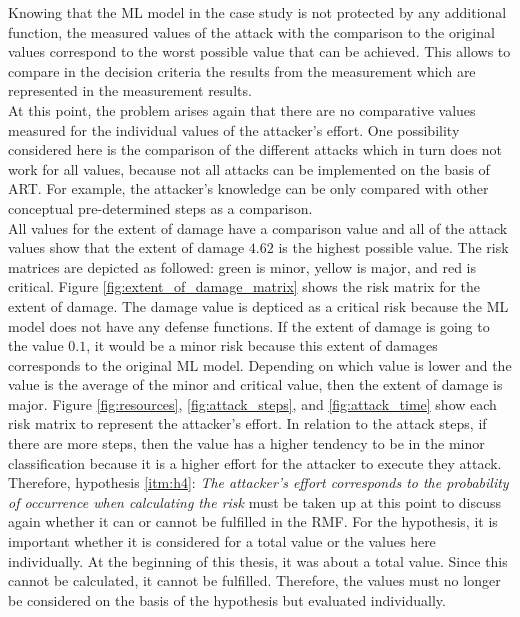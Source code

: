 Knowing that the ML model in the case study is not protected by any additional function, the measured values of the attack with the comparison to the original values correspond to the worst possible value that can be achieved. This allows to compare in the decision criteria the results from the measurement which are represented in the measurement results. \\
At this point, the problem arises again that there are no comparative values measured for the individual values of the attacker's effort. One possibility considered here is the comparison of the different attacks which in turn does not work for all values, because not all attacks can be implemented on the basis of ART. For example, the attacker's knowledge can be only compared with other conceptual pre-determined steps as a comparison. \\
All values for the extent of damage have a comparison value and all of the attack values show that the extent of damage $4.62$ is the highest possible value.
The risk matrices are depicted as followed: green is minor, yellow is major, and red is critical.
Figure \ref{fig:extent_of_damage_matrix} shows the risk matrix for the extent of damage. The damage value is depticed as a critical risk because the ML model does not have any defense functions. If the extent of damage is going to the value $0.1$, it would be a minor risk because this extent of damages corresponds to the original ML model. Depending on which value is lower and the value is the average of the minor and critical value, then the extent of damage is major. Figure \ref{fig:resources}, \ref{fig:attack_steps}, and \ref{fig:attack_time} show each risk matrix to represent the attacker's effort. In relation to the attack steps, if there are more steps, then the value has a higher tendency to be in the minor classification because it is a higher effort for the attacker to execute they attack. Therefore,
hypothesis \ref{itm:h4}: \textit{The attacker's effort corresponds to the probability of occurrence when calculating the risk} must be taken up at this point to discuss again whether it can or cannot be fulfilled in the RMF. For the hypothesis, it is important whether it is considered for a total value or the values here individually. At the beginning of this thesis, it was about a total value. Since this cannot be calculated, it cannot be fulfilled. Therefore, the values must no longer be considered on the basis of the hypothesis but evaluated individually. \\
